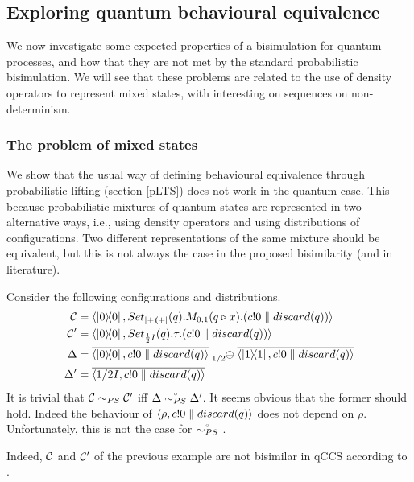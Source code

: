 \subsection{Exploring quantum behavioural equivalence}
We now investigate some expected properties of a bisimulation for quantum processes, and how that they are not met by the standard probabilistic bisimulation. We will see that these problems are related to the use of density operators to represent mixed states, with interesting on sequences on non-determinism.

\subsubsection*{The problem of mixed states}

We show that the usual way of defining behavioural equivalence through probabilistic lifting (section \ref{pLTS}) does not work in the quantum case.
This because probabilistic mixtures of quantum states are represented in two alternative ways, i.e., using density operators and using distributions of configurations.
Two different representations of the same mixture should be equivalent, but this is not always the case in the proposed bisimilarity (and in literature).

\begin{example}
	Consider the following configurations and distributions.
	\begin{align*}
		\conf &= \confw{\ketbra{0}{0}, Set_{\ketbra{+}{+}}(q).M_{0,1}(q \triangleright x).(c!0 \parallel discard(q))}\\
		\conf' &= \confw{\ketbra{0}{0}, Set_{\frac{1}{2} I}(q).\tau.(c!0 \parallel discard(q))}\\
		\Delta &= \overline{\confw{\ketbra{0}{0}, c!0 \parallel discard(q)}} \psum{1/2} \overline{\confw{\ketbra{1}{1}, c!0 \parallel discard(q)}}\\
		\Delta' &= \overline{\confw{1/2 I, c!0 \parallel discard(q)}}
	\end{align*}
	It is trivial that $\mathcal{C} \sim_{PS} \mathcal{C}'$ iff $\Delta	\stackrel{\scriptscriptstyle \circ}{\sim_{PS}} \Delta'$.
	It seems obvious that the former should hold.
	Indeed the behaviour of $\langle\rho, c!0 \parallel discard(q)\rangle$ does not depend on $\rho$.
	Unfortunately, this is not the case for $\stackrel{\scriptscriptstyle \circ}{\sim_{PS}}$ .
\end{example}
Indeed, $\mathcal{C}$ and $\mathcal{C}'$ of the previous example are not bisimilar in qCCS according to \cite{fengBisimulationQuantumProcesses2012, dengOpenBisimulationQuantum2012}.

